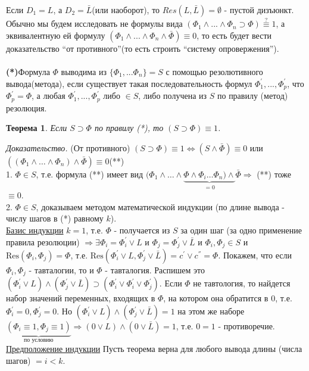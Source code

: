 \documentclass{article}
\newtheorem{theorem}{Теорема}
\numberwithin{example}{section}
\numberwithin{question}{section}
\numberwithin{Remark}{section}
\numberwithin{theorem}{section}
\numberwithin{definition}{section}
\numberwithin{proposition}{section}
\begin{document}
Если $D_1 =L$, а $D_2 =\bar{L}$(или наоборот), то $Res(L,\bar{L})=\emptyset$ - пустой дизъюнкт.\\
Обычно мы будем исследовать не формулы вида $(\Phi_1 \land ... \land \Phi_n \supset \Phi)\stackrel{?}{\equiv} 1$, а эквивалентную ей формулу $(\Phi_1 \land ... \land \Phi_n \land \bar{\Phi})\equiv 0$, то есть будет вести доказательство ``от противного''(то есть строить ``систему опровержения'').\\
\\
\textbf{(*)}Формула $\Phi$ выводима из $\{\Phi_1 ,...\Phi_n \}=S$ с помощью резолютивного вывода(метода), если существует такая последовательность формул $ \Phi_1^{'},...,\Phi_p^{'}$, что $\Phi_p^{'}=\Phi$, а любая $\Phi_1^{'},...,\Phi_p^{'}$ либо $\in S$, либо получена из $S$ по правилу (метод) резолюция.
\begin{theorem}
Если $S\supset \Phi$ по правилу (*), то $(S\supset \Phi)\equiv 1$.
\end{theorem}
\emph{Доказательство. } (От противного) $(S\supset \Phi)\equiv 1\Leftrightarrow (S\wedge\bar{\Phi})\equiv 0$ или $((\Phi_1\wedge\ldots\wedge\Phi_n)\wedge\bar{\Phi})\equiv 0$(**)\\
1. $\Phi\in S$, т.е. формула (**) имеет вид $(\Phi_1\wedge\ldots\wedge\underbrace{\Phi\wedge\Phi_i\ldots\Phi_n)\wedge}_{=0}\bar{\Phi}\Rightarrow$ (**) тоже $\equiv 0$.\\
2. $\Phi\in S$, доказываем методом математической индукции (по длине вывода - числу шагов в (*) равному $k$).\\
\underline{Базис индукции} $k=1$, т.е. $\Phi$ - получается из $S$ за один шаг (за одно применение правила резолюции) $\Rightarrow\exists \Phi_i=\Phi_i^{'}\vee L$ и $\Phi_j=\Phi_j^{'}\vee \bar{L}$ и $\Phi_i,\Phi_j\in S$ и $\mathrm{Res}(\Phi_i,\Phi_j)=\Phi$, т.е. $\mathrm{Res}(\Phi_i^{'}\vee L,\Phi_j^{'}\vee\bar{L})=c^{'}\vee c^{''}=\Phi$. Покажем, что если $\Phi_i,\Phi_j$ - тавталогии, то и $\Phi$ - тавталогия. Распишем это $(\Phi_i^{'}\vee L)\wedge(\Phi_j^{'}\vee\bar{L})\supset (\Phi_i^{'}\vee \Phi_i^{'}\vee\Phi_j^{'})$. Если $\Phi$ не тавтология, то найдется набор значений переменных, входящих в $\Phi$, на котором она обратится в $0$, т.е. $\Phi_i^{'}=0,\Phi_j^{'}=0$. Но $(\Phi_i^{'}\vee L)\wedge(\Phi_j^{'}\vee\bar{L})=1$ на этом же наборе $\underbrace{(\Phi_i\equiv 1,\Phi_j\equiv 1)}_{\text{по условию}}\Rightarrow (0\vee L)\wedge(0\vee\bar{L})=1$, т.е. $0=1$ - противоречие.\\
\underline{Предположение индукции} Пусть теорема верна для любого вывода длины (числа шагов) $=i<k$.\\
\end{document}
